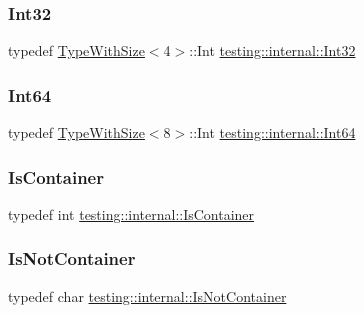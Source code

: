 \subsubsection{\texorpdfstring{Int32}{Int32}}
{\footnotesize\ttfamily typedef \hyperlink{classtesting_1_1internal_1_1TypeWithSize}{Type\+With\+Size}$<$4$>$\+::Int \hyperlink{namespacetesting_1_1internal_a8ee38faaf875f133358abaf9bc056cec}{testing\+::internal\+::\+Int32}}

\mbox{\label{namespacetesting_1_1internal_a271c563fec38b804ddab0677f51f70a8}} 
\subsubsection{\texorpdfstring{Int64}{Int64}}
{\footnotesize\ttfamily typedef \hyperlink{classtesting_1_1internal_1_1TypeWithSize}{Type\+With\+Size}$<$8$>$\+::Int \hyperlink{namespacetesting_1_1internal_a271c563fec38b804ddab0677f51f70a8}{testing\+::internal\+::\+Int64}}

\mbox{\label{namespacetesting_1_1internal_ad8f0c2883245f1df2a53618a49f0deb3}} 
\subsubsection{\texorpdfstring{Is\+Container}{IsContainer}}
{\footnotesize\ttfamily typedef int \hyperlink{namespacetesting_1_1internal_ad8f0c2883245f1df2a53618a49f0deb3}{testing\+::internal\+::\+Is\+Container}}

\mbox{\label{namespacetesting_1_1internal_abf080521ce135deb510e0a7830fd3d33}} 
\subsubsection{\texorpdfstring{Is\+Not\+Container}{IsNotContainer}}
{\footnotesize\ttfamily typedef char \hyperlink{namespacetesting_1_1internal_abf080521ce135deb510e0a7830fd3d33}{testing\+::internal\+::\+Is\+Not\+Container}}

